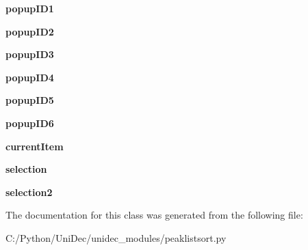 \begin{DoxyCompactItemize}
\item 
\hypertarget{class_uni_dec_1_1unidec__modules_1_1peaklistsort_1_1_peak_list_ctrl_panel_a67be2b421e607749d8ec455c9983c3d6}{}{\bfseries popup\+I\+D1}\label{class_uni_dec_1_1unidec__modules_1_1peaklistsort_1_1_peak_list_ctrl_panel_a67be2b421e607749d8ec455c9983c3d6}

\item 
\hypertarget{class_uni_dec_1_1unidec__modules_1_1peaklistsort_1_1_peak_list_ctrl_panel_a62901fb7ab029bf53d5d136722101a85}{}{\bfseries popup\+I\+D2}\label{class_uni_dec_1_1unidec__modules_1_1peaklistsort_1_1_peak_list_ctrl_panel_a62901fb7ab029bf53d5d136722101a85}

\item 
\hypertarget{class_uni_dec_1_1unidec__modules_1_1peaklistsort_1_1_peak_list_ctrl_panel_a2105129d00be5a2b00c4fc46852fe39f}{}{\bfseries popup\+I\+D3}\label{class_uni_dec_1_1unidec__modules_1_1peaklistsort_1_1_peak_list_ctrl_panel_a2105129d00be5a2b00c4fc46852fe39f}

\item 
\hypertarget{class_uni_dec_1_1unidec__modules_1_1peaklistsort_1_1_peak_list_ctrl_panel_a86c3707c7ca51f1da890e0eb36a2eafc}{}{\bfseries popup\+I\+D4}\label{class_uni_dec_1_1unidec__modules_1_1peaklistsort_1_1_peak_list_ctrl_panel_a86c3707c7ca51f1da890e0eb36a2eafc}

\item 
\hypertarget{class_uni_dec_1_1unidec__modules_1_1peaklistsort_1_1_peak_list_ctrl_panel_a03762da3ef531481ec83b513eacc8e12}{}{\bfseries popup\+I\+D5}\label{class_uni_dec_1_1unidec__modules_1_1peaklistsort_1_1_peak_list_ctrl_panel_a03762da3ef531481ec83b513eacc8e12}

\item 
\hypertarget{class_uni_dec_1_1unidec__modules_1_1peaklistsort_1_1_peak_list_ctrl_panel_aadb9fd50674c37492afc7a748a095126}{}{\bfseries popup\+I\+D6}\label{class_uni_dec_1_1unidec__modules_1_1peaklistsort_1_1_peak_list_ctrl_panel_aadb9fd50674c37492afc7a748a095126}

\item 
\hypertarget{class_uni_dec_1_1unidec__modules_1_1peaklistsort_1_1_peak_list_ctrl_panel_af126c62695cfd31d51dbf40e9a416658}{}{\bfseries current\+Item}\label{class_uni_dec_1_1unidec__modules_1_1peaklistsort_1_1_peak_list_ctrl_panel_af126c62695cfd31d51dbf40e9a416658}

\item 
\hypertarget{class_uni_dec_1_1unidec__modules_1_1peaklistsort_1_1_peak_list_ctrl_panel_a037ad44ca7e1c348a9f18aa1444385fc}{}{\bfseries selection}\label{class_uni_dec_1_1unidec__modules_1_1peaklistsort_1_1_peak_list_ctrl_panel_a037ad44ca7e1c348a9f18aa1444385fc}

\item 
\hypertarget{class_uni_dec_1_1unidec__modules_1_1peaklistsort_1_1_peak_list_ctrl_panel_ac3f08415b21e9d9cfb142875dda71685}{}{\bfseries selection2}\label{class_uni_dec_1_1unidec__modules_1_1peaklistsort_1_1_peak_list_ctrl_panel_ac3f08415b21e9d9cfb142875dda71685}

\end{DoxyCompactItemize}


The documentation for this class was generated from the following file\+:\begin{DoxyCompactItemize}
\item 
C\+:/\+Python/\+Uni\+Dec/unidec\+\_\+modules/peaklistsort.\+py\end{DoxyCompactItemize}
